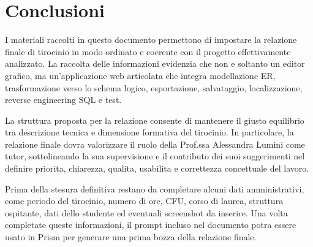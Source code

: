 
\chapter*{Conclusioni}\label{ch:conclusioni}

I materiali raccolti in questo documento permettono di impostare la relazione finale di tirocinio in modo ordinato e coerente con il progetto effettivamente analizzato. La raccolta delle informazioni evidenzia che \builder{} non e soltanto un editor grafico, ma un'applicazione web articolata che integra modellazione ER, trasformazione verso lo schema logico, esportazione, salvataggio, localizzazione, reverse engineering SQL e test.

La struttura proposta per la relazione consente di mantenere il giusto equilibrio tra descrizione tecnica e dimensione formativa del tirocinio. In particolare, la relazione finale dovra valorizzare il ruolo della Prof.ssa Alessandra Lumini come tutor, sottolineando la sua supervisione e il contributo dei suoi suggerimenti nel definire priorita, chiarezza, qualita, usabilita e correttezza concettuale del lavoro.

Prima della stesura definitiva restano da completare alcuni dati amministrativi, come periodo del tirocinio, numero di ore, CFU, corso di laurea, struttura ospitante, dati dello studente ed eventuali screenshot da inserire. Una volta completate queste informazioni, il prompt incluso nel documento potra essere usato in Prism per generare una prima bozza della relazione finale.
